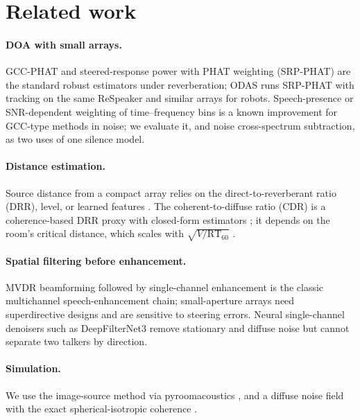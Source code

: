 \section{Related work}

\paragraph{DOA with small arrays.} GCC-PHAT \cite{knapp1976gcc} and
steered-response power with PHAT weighting (SRP-PHAT)
\cite{dibiase2001srp} are the standard robust estimators under
reverberation; ODAS \cite{grondin2019odas} runs SRP-PHAT with tracking on
the same ReSpeaker and similar arrays for robots. Speech-presence or
SNR-dependent weighting of time--frequency bins is a known improvement for
GCC-type methods in noise; we evaluate it, and noise cross-spectrum
subtraction, as two uses of one silence model.

\paragraph{Distance estimation.} Source distance from a compact array
relies on the direct-to-reverberant ratio (DRR), level, or learned
features \cite{vesa2009binaural}. The coherent-to-diffuse ratio (CDR) is a
coherence-based DRR proxy with closed-form estimators
\cite{schwarz2015cdr}; it depends on the room's critical distance, which
scales with $\sqrt{V/\mathrm{RT}_{60}}$ \cite{kuttruff2016room}.

\paragraph{Spatial filtering before enhancement.} MVDR beamforming
\cite{capon1969mvdr} followed by single-channel enhancement is the classic
multichannel speech-enhancement chain; small-aperture arrays need
superdirective designs and are sensitive to steering errors. Neural
single-channel denoisers such as DeepFilterNet3
\cite{schroeter2023deepfilternet3} remove stationary and diffuse noise but
cannot separate two talkers by direction.

\paragraph{Simulation.} We use the image-source method
\cite{allen1979image} via pyroomacoustics \cite{scheibler2018pra}, and a
diffuse noise field with the exact spherical-isotropic coherence
\cite{habets2008diffuse}.
